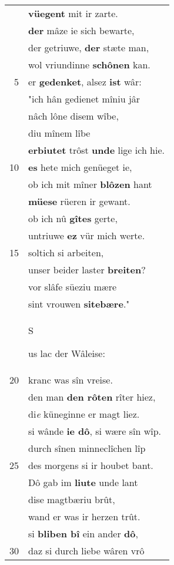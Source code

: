 \documentclass[8pt,a4paper,notitlepage]{article}
\begin{document}
\begin{table}[ht]
\begin{minipage}[t]{0.5\linewidth}
\begin{center}
\end{center}
\begin{tabular}{rl}
 & \textbf{vüegent} mit ir zarte.\\ 
 & \textbf{der} mâze ie sich bewarte,\\ 
 & der getriuwe, \textbf{der} stæte man,\\ 
 & wol vriundinne \textbf{schônen} kan.\\ 
5 & er \textbf{gedenket}, alsez \textbf{ist} wâr:\\ 
 & "ich hân gedienet mîniu jâr\\ 
 & nâch lône disem wîbe,\\ 
 & diu mînem lîbe\\ 
 & \textbf{erbiutet} trôst \textbf{unde} lige ich hie.\\ 
10 & \textbf{es} hete mich genüeget ie,\\ 
 & ob ich mit mîner \textbf{blôzen} hant\\ 
 & \textbf{müese} rüeren ir gewant.\\ 
 & ob ich nû \textbf{gîtes} gerte,\\ 
 & untriuwe \textbf{ez} vür mich werte.\\ 
15 & soltich si arbeiten,\\ 
 & unser beider laster \textbf{breiten}?\\ 
 & vor slâfe süeziu mære\\ 
 & sint vrouwen \textbf{sitebære}."\\ 
 & \begin{large}S\end{large}us lac der Wâleise:\\ 
20 & kranc was sîn vreise.\\ 
 & den man \textbf{den rôten} rîter hiez,\\ 
 & di\textit{e} küneginne er magt liez.\\ 
 & si wânde \textbf{ie dô}, si wære sîn wîp.\\ 
 & durch sînen minneclîchen lîp\\ 
25 & des morgens si ir houbet bant.\\ 
 & Dô gab im \textbf{liute} unde lant\\ 
 & dise magtbæriu brût,\\ 
 & wand er was ir herzen trût.\\ 
 & si \textbf{bliben bî} ein ander \textbf{dô},\\ 
30 & daz si durch liebe wâren vrô\\ 
\end{tabular}

\end{minipage}
\end{table}
\end{document}
